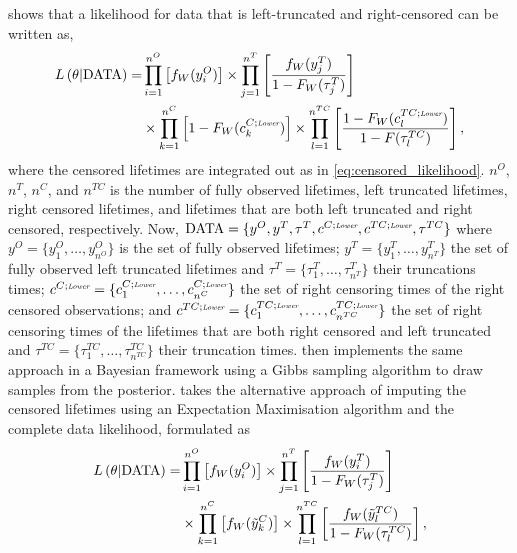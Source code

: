 \citet{hong2009} shows that a likelihood for data that is left-truncated and right-censored can be written as,
\begin{align}
    \label{eq:left_trunc_and_right_cens_int}
    L\left(\theta|\hbox{DATA}\right) = & 
    \prod^{n^O}_{i = 1}\left[f_W(y^O_i) \right] \times
    \prod^{n^T}_{j = 1}\left[\frac{f_W(y^T_j)}{1 - F_W(\tau^T_j)} \right] \\
    & \times \prod^{n^C}_{k = 1}\left[1 - F_W(c^{C;\textit{\tiny{Lower}}}_k)\right]
    \times \prod^{n^{TC}}_{l = 1}\left[\frac{1 - F_W(c^{TC; \textit{\tiny{Lower}}}_l)}{1 - F(\tau^{TC}_l)}\right] \nonumber,
\end{align}
where the censored lifetimes are integrated out as in \eqref{eq:censored_likelihood}. $n^O$, $n^T$, $n^C$, and $n^{TC}$ is the number of fully observed lifetimes, left truncated lifetimes, right censored lifetimes, and lifetimes that are both left truncated and right censored, respectively. Now, $\text{DATA} = \{y^O, y^T, \tau^T, c^{C;\textit{\tiny{Lower}}}, c^{TC;\textit{\tiny{Lower}}}, \tau^{TC}\}$ where $y^O = \{y^O_1, \dots, y^O_{n^O}\}$ is the set of fully observed lifetimes; $y^T = \{y^T_1, \dots, y^T_{n^T}\}$ the set of fully observed left truncated lifetimes and $\tau^T = \{\tau^T_1, \dots, \tau^T_{n^T}\}$ their truncations times; $c^{C;\textit{\tiny{Lower}}} = \{c^{C;\textit{\tiny{Lower}}}_1, \dots, c^{C;\textit{\tiny{Lower}}}_{n^C}\}$ the set of right censoring times of the right censored observations; and $c^{TC;\textit{\tiny{Lower}}} = \{c^{TC;\textit{\tiny{Lower}}}_1, \dots, c^{TC;\textit{\tiny{Lower}}}_{n^{TC}}\}$ the set of right censoring times of the lifetimes that are both right censored and left truncated and $\tau^{TC} = \{\tau^{TC}_1, \dots, \tau^{TC}_{n^{TC}}\}$ their truncation times. \citet{kundu2016} then implements the same approach in a Bayesian framework using a Gibbs sampling algorithm to draw samples from the posterior. \citet{mitra2013} takes the alternative approach of imputing the censored lifetimes using an Expectation Maximisation algorithm and the complete data likelihood, formulated as
\begin{align}
    \label{eq:left_trunc_and_right_cens_imp}
    L\left(\theta|\hbox{DATA}\right) = & 
    \prod^{n^O}_{i = 1}\left[f_W(y^O_i) \right] \times
    \prod^{n^T}_{j = 1}\left[\frac{f_W(y^T_i)}{1 - F_W(\tau^T_j)} \right] \\
    & \times \prod^{n^C}_{k = 1}\left[f_W(\tilde{y}^C_k)\right]
    \times \prod^{n^{TC}}_{l = 1}\left[\frac{f_W(\tilde{y}^{TC}_l)}{1 - F_W(\tau^{TC}_l)}\right] \nonumber,
\end{align}

